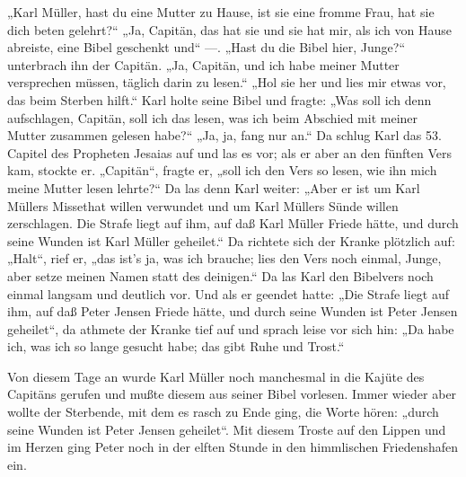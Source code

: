 „Karl Müller, hast du eine Mutter zu Hause, ist sie eine fromme Frau, hat sie dich beten gelehrt?“ „Ja, Capitän, das hat sie und sie hat mir, als ich von Hause abreiste, eine Bibel geschenkt und“ —. „Hast du die Bibel hier, Junge?“ unterbrach ihn der Capitän. „Ja, Capitän, und ich habe meiner Mutter versprechen müssen, täglich darin zu lesen.“ „Hol sie her und lies mir etwas vor, das beim Sterben hilft.“ Karl holte seine Bibel und fragte: „Was soll ich denn aufschlagen, Capitän, soll ich das lesen, was ich beim Abschied mit meiner Mutter zusammen gelesen habe?“ „Ja, ja, fang nur an.“ Da schlug Karl das 53. Capitel des Propheten Jesaias auf und las es vor; als er aber an den fünften Vers kam, stockte er. „Capitän“, fragte er, „soll ich den Vers so lesen, wie ihn mich meine Mutter lesen lehrte?“ Da las denn Karl weiter: „Aber er ist um Karl Müllers Missethat willen verwundet und um Karl Müllers Sünde willen zerschlagen. Die Strafe liegt auf ihm, auf daß Karl Müller Friede hätte, und durch seine Wunden ist Karl Müller geheilet.“ Da richtete sich der Kranke plötzlich auf: „Halt“, rief er, „das ist’s ja, was ich brauche; lies den Vers noch einmal, Junge, aber setze meinen Namen statt des deinigen.“ Da las Karl den Bibelvers noch einmal langsam und deutlich vor. Und als er geendet hatte: „Die Strafe liegt auf ihm, auf daß Peter Jensen Friede hätte, und durch seine Wunden ist Peter Jensen geheilet“, da athmete der Kranke tief auf und sprach leise vor sich hin: „Da habe ich, was ich so lange gesucht habe; das gibt Ruhe und Trost.“

Von diesem Tage an wurde Karl Müller noch manchesmal in die Kajüte des Capitäns gerufen und mußte diesem aus seiner Bibel vorlesen. Immer wieder aber wollte der Sterbende, mit dem es rasch zu Ende ging, die Worte hören: „durch seine Wunden ist Peter Jensen geheilet“. Mit diesem Troste auf den Lippen und im Herzen ging Peter noch in der elften Stunde in den himmlischen Friedenshafen ein.
